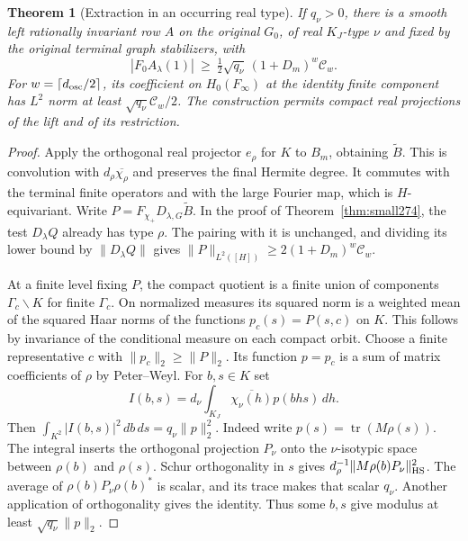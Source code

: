 \documentclass[a4paper,11pt]{article}
\newtheorem{theorem}[proposition]{Theorem}
\theoremstyle{definition}
\theoremstyle{remark}
\numberwithin{equation}{section}
\begin{document}
\begin{theorem}[Extraction in an occurring real type]\leavevmode
\label{thm:extract275}
If \(q_\nu>0\), there is a smooth left rationally invariant row
\(A\) on the original \(G_0\), of real \(K_J\)-type \(\nu\)
and fixed by the original terminal graph stabilizers, with
\[
       |F_0 A_\lambda(1)|
          \ \ge\ \tfrac12\sqrt{q_\nu}\,(1+D_m)^w\mathcal C_w .
\]
For \(w=\lceil d_{\rm osc}/2\rceil\), its coefficient on
\(H_0(F_\infty)\) at the identity finite component has
\(L^2\) norm at least \(\sqrt{q_\nu}\mathcal C_w/2\).
The construction permits compact real projections of the lift
and of its restriction.
\end{theorem}
\begin{proof}
Apply the orthogonal real projector \(e_\rho\) for \(K\) to
\(B_m\), obtaining \(\widetilde B\). This is convolution with
\(d_\rho\overline{\chi_\rho}\) and preserves the final Hermite
degree. It commutes with the terminal finite operators and
with the large Fourier map, which is \(H\)-equivariant.
Write \(P=F_{\chi_+}D_{\lambda,G}\widetilde B\).
In the proof of Theorem~\ref{thm:small274}, the test
\(D_\lambda Q\) already has type \(\rho\). The pairing with
it is unchanged, and dividing its lower bound by
\(\|D_\lambda Q\|\) gives
\(\|P\|_{L^2([H])}\ge2(1+D_m)^w\mathcal C_w\).

At a finite level fixing \(P\), the compact quotient is
a finite union of components \(\Gamma_c\backslash K\)
for finite \(\Gamma_c\). On normalized measures its squared
norm is a weighted mean of the squared Haar norms of the
functions \(p_c(s)=P(s,c)\) on \(K\). This follows by
invariance of the conditional measure on each compact
orbit. Choose a finite representative \(c\) with
\(\|p_c\|_2\ge\|P\|_2\). Its function \(p=p_c\) is a sum
of matrix coefficients of \(\rho\) by Peter--Weyl.
For \(b,s\in K\) set
\[
        I(b,s)=d_\nu\int_{K_J}\overline{\chi_\nu(h)}
                                      p(bhs)\,dh .
\]
Then \(\int_{K^2}|I(b,s)|^2\,db\,ds=q_\nu\|p\|_2^2\).
Indeed write \(p(s)=\operatorname{tr}(M\rho(s))\).
The integral inserts the orthogonal projection \(P_\nu\)
onto the \(\nu\)-isotypic space between \(\rho(b)\) and
\(\rho(s)\). Schur orthogonality in \(s\) gives
\(d_\rho^{-1}\|M\rho(b)P_\nu\|_{\rm HS}^2\).
The average of \(\rho(b)P_\nu\rho(b)^*\) is scalar, and
its trace makes that scalar \(q_\nu\). Another application
of orthogonality gives the identity. Thus some \(b,s\)
give modulus at least \(\sqrt{q_\nu}\|p\|_2\).


\end{proof}
\end{document}
